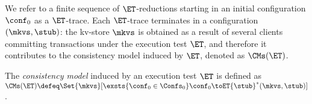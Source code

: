 We refer to a finite sequence of $\ET$-reductions starting in an initial configuration $\conf_{0}$ as a $\ET$-trace. 
Each $\ET$-trace terminates in a configuration $(\mkvs, \stub)$: the 
kv-store $\mkvs$ is obtained as a result of several clients committing transactions under the 
execution test $\ET$, and therefore it contributes to the consistency model induced by $\ET$, 
denoted as $\CMs(\ET)$.
%
%

\begin{definition}
\label{def:cm}
The \emph{consistency model} induced by an execution test $\ET$ is defined as 
\(
\CMs(\ET) \defeq 
\Set{\mkvs}[ 
\exsts{\conf_0 \in \Confs_0}
\conf_0 \toET{\stub}^{*} (\mkvs, \stub)
]
\).
\end{definition}
%

